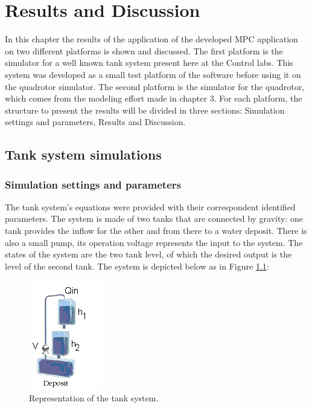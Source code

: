 \chapter{Results and Discussion}
\label{chap:Results_and_Discussion}

In this chapter the results of the application of the developed MPC application on two different platforms is shown and discussed. The first platform is the simulator for a well known tank system present here at the Control labs. This system was developed as a small test platform of the software before using it on the quadrotor simulator. The second platform is the simulator for the quadrotor, which comes from the modeling effort made in chapter 3. For each platform, the structure to present the results will be divided in three sections: Simulation settings and parameters, Results and Discussion.

\section{Tank system simulations}

\subsection{Simulation settings and parameters}

The tank system's equations were provided with their correspondent identified parameters. The system is made of two tanks that are connected by gravity: one tank provides the inflow for the other and from there to a water deposit. There is also a small pump, its operation voltage represents the input to the system. The states of the system are the two tank level, of which the desired output is the level of the second  tank.  The system is depicted below as in Figure \ref{fig:tank_system}: 

\begin{figure}[H]
\centering
\includegraphics[scale=0.7]{Images/Chapter5/tank_system.png}
\caption{Representation of the tank system.}
\label{fig:tank_system}
\end{figure}

